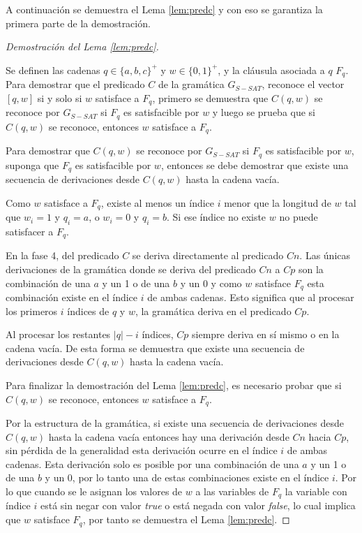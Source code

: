 \documentclass{article}
\newcommand{\true}{\textit{true}}
\newcommand{\false}{\textit{false}}
\begin{document}
A continuación se demuestra el Lema \ref{lem:predc} y con eso se garantiza la primera parte de la demostración.

\begin{proof}[Demostración del Lema \ref{lem:predc}] \

    Se definen las cadenas $q\in \{a,b,c\}^+$ y $w\in \{0,1\}^+$, y la cláusula asociada a $q$ $F_q$.  Para demostrar que el predicado $C$ de la gramática $G_{S-SAT}$, reconoce el vector $[q,w]$ si y solo si $w$ satisface a $F_q$, primero se demuestra que $C(q,w)$ se reconoce por $G_{S-SAT}$ si $F_q$ es satisfacible por $w$ y luego se prueba que si $C(q,w)$ se reconoce, entonces $w$ satisface a $F_q$.

    Para demostrar que $C(q,w)$ se reconoce por $G_{S-SAT}$ si $F_q$ es satisfacible por $w$, suponga que $F_q$ es satisfacible por $w$, entonces se debe demostrar que existe una secuencia de derivaciones desde $C(q,w)$ hasta la cadena vacía.

    Como $w$ satisface a $F_q$, existe al menos un índice $i$ menor que la longitud de $w$ tal que $w_i=1$ y $q_i = a$, o $w_i=0$ y $q_i=b$. Si ese índice no existe $w$ no puede satisfacer a $F_q$.

    En la fase 4, del predicado $C$ se deriva directamente al predicado $Cn$. Las únicas derivaciones de la gramática donde se deriva del predicado $Cn$ a $Cp$ son la combinación de una $a$ y un 1 o de una $b$ y un 0 y como $w$ satisface $F_q$ esta combinación existe en el índice $i$ de ambas cadenas. Esto significa que al procesar los primeros $i$ índices de $q$ y $w$, la gramática deriva en el predicado $Cp$.

    Al procesar los restantes $|q|-i$ índices, $Cp$ siempre deriva en sí mismo o en la cadena vacía. De esta forma se demuestra que existe una secuencia de derivaciones desde $C(q,w)$ hasta la cadena vacía.

    Para finalizar la demostración del Lema \ref{lem:predc}, es necesario probar que si $C(q,w)$ se reconoce, entonces $w$ satisface a $F_q$.

    Por la estructura de la gramática, si existe una secuencia de derivaciones desde $C(q,w)$ hasta la cadena vacía entonces hay una derivación desde $Cn$ hacia $Cp$, sin pérdida de la generalidad esta derivación ocurre en el índice $i$ de ambas cadenas. Esta derivación solo es posible por una combinación de una $a$ y un 1 o de una $b$ y un 0, por lo tanto una de estas combinaciones existe en el índice $i$. Por lo que cuando se le asignan los valores de $w$ a las variables de $F_q$ la variable con índice $i$ está
    sin negar con valor \true{} o está negada con valor \false{}, lo cual implica que $w$ satisface $F_q$, por tanto se demuestra el Lema \ref{lem:predc}.
\end{proof}
\end{document}
